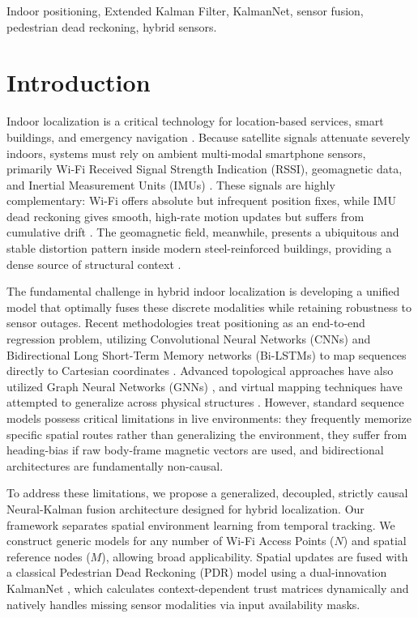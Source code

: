 \documentclass[conference]{IEEEtran}
\begin{document}
\begin{IEEEkeywords}
Indoor positioning, Extended Kalman Filter, KalmanNet, sensor fusion, pedestrian dead reckoning, hybrid sensors.
\end{IEEEkeywords}

\section{Introduction}

Indoor localization is a critical technology for location-based services, smart buildings, and emergency navigation \cite{radar}. Because satellite signals attenuate severely indoors, systems must rely on ambient multi-modal smartphone sensors, primarily Wi-Fi Received Signal Strength Indication (RSSI), geomagnetic data, and Inertial Measurement Units (IMUs) \cite{horus, hybridwifi}. These signals are highly complementary: Wi-Fi offers absolute but infrequent position fixes, while IMU dead reckoning gives smooth, high-rate motion updates but suffers from cumulative drift \cite{nnwifipdr}. The geomagnetic field, meanwhile, presents a ubiquitous and stable distortion pattern inside modern steel-reinforced buildings, providing a dense source of structural context \cite{overviewdatasets}.

The fundamental challenge in hybrid indoor localization is developing a unified model that optimally fuses these discrete modalities while retaining robustness to sensor outages. Recent methodologies treat positioning as an end-to-end regression problem, utilizing Convolutional Neural Networks (CNNs) and Bidirectional Long Short-Term Memory networks (Bi-LSTMs) to map sequences directly to Cartesian coordinates \cite{deeppos,minloc, bilstmmag}. Advanced topological approaches have also utilized Graph Neural Networks (GNNs) \cite{wang2024gnn}, and virtual mapping techniques have attempted to generalize across physical structures \cite{rizk2023globloc}. However, standard sequence models possess critical limitations in live environments: they frequently memorize specific spatial routes rather than generalizing the environment, they suffer from heading-bias if raw body-frame magnetic vectors are used, and bidirectional architectures are fundamentally non-causal.

To address these limitations, we propose a generalized, decoupled, strictly causal Neural-Kalman fusion architecture designed for hybrid localization. Our framework separates spatial environment learning from temporal tracking. We construct generic models for any number of Wi-Fi Access Points ($N$) and spatial reference nodes ($M$), allowing broad applicability. Spatial updates are fused with a classical Pedestrian Dead Reckoning (PDR) model using a dual-innovation KalmanNet \cite{kalmannet}, which calculates context-dependent trust matrices dynamically and natively handles missing sensor modalities via input availability masks. 
\end{document}
